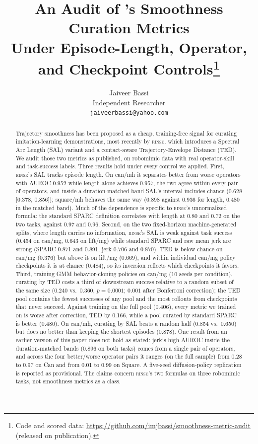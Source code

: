 \documentclass[10pt]{article}
\title{An Audit of \rinse{}'s Smoothness Curation Metrics\\
Under Episode-Length, Operator, and Checkpoint Controls\thanks{Code and scored data:
\url{https://github.com/imjbassi/smoothness-metric-audit} (released on publication).}}
\author{Jaiveer Bassi \\ Independent Researcher \\ \texttt{jaiveerbassi@yahoo.com}}
\date{}
\newcommand{\rinse}{\textmd{\textsc{rinse}}}
\begin{document}
\maketitle

\begin{abstract}
Trajectory smoothness has been proposed as a cheap, training-free signal for
curating imitation-learning demonstrations, most recently by \rinse{}, which
introduces a Spectral Arc Length (SAL) variant and a contact-aware
Trajectory-Envelope Distance (TED). We audit those two metrics as published,
on robomimic data with real operator-skill and task-success labels. Three
results hold under every control we applied. First, \rinse{}'s SAL tracks
episode length. On can/mh it separates better from worse operators with
AUROC 0.952 while length alone achieves 0.957, the two agree within every
pair of operators, and inside a duration-matched band SAL's interval
includes chance (0.628 [0.378, 0.856]); square/mh behaves the same way
(0.898 against 0.936 for length, 0.480 in the matched band). Much of the
dependence is specific to \rinse{}'s unnormalized formula: the standard
SPARC definition correlates with length at 0.80 and 0.72 on the two tasks,
against 0.97 and 0.96. Second, on the two fixed-horizon machine-generated
splits, where length carries no information, \rinse{}'s SAL is weak against
task success (0.454 on can/mg, 0.643 on lift/mg) while standard SPARC and
raw mean jerk are strong (SPARC 0.871 and 0.891, jerk 0.706 and 0.870). TED
is below chance on can/mg (0.376) but above it on lift/mg (0.669), and
within individual can/mg policy checkpoints it is at chance (0.484), so its
inversion reflects which checkpoints it favors. Third, training GMM
behavior-cloning policies on can/mg (10 seeds per condition), curating by
TED costs a third of downstream success relative to a random subset of the
same size (0.240 vs.\ 0.360, $p{=}0.0001$; $0.001$ after Bonferroni
correction); the TED pool contains the fewest successes of any pool and the
most rollouts from checkpoints that never succeed. Against training on the
full pool (0.406), every metric we trained on is worse after correction,
TED by 0.166, while a pool curated by standard SPARC is better (0.480).
On can/mh, curating by SAL beats a random half (0.854 vs.\ 0.650) but
does no better than keeping the shortest episodes (0.878). One result from an
earlier version of this paper does not hold as stated: jerk's high AUROC
inside the duration-matched bands (0.896 on both tasks) comes from a single
pair of operators, and across the four better/worse operator pairs it ranges
(on the full sample) from 0.28 to 0.97 on Can and from 0.01 to 0.99 on
Square. A five-seed
diffusion-policy replication is reported as provisional. The claims concern
\rinse{}'s two formulas on three robomimic tasks, not smoothness metrics as
a class.
\end{abstract}
\end{document}
